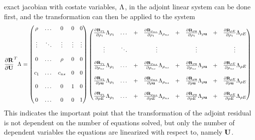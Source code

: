 exact jacobian with costate variables, $\Lambda_{}$, in the adjoint linear system
can be done first, and the transformation can then be applied to the system
\begin{equation}
  \begin{aligned}
    \pd{\mr}{\mU}^{T} \adjlam{} =
    \begin{pmatrix}
      \rho   & \dots  & 0      &  0      & 0      \\ \\
      \vdots & \ddots & \vdots &  \vdots & \vdots \\ \\
      0      & \dots  &\rho    &  0      & 0      \\ \\
      c_1    & \dots  & c_{ns} &  0      & 0      \\ \\
      0      & \dots  & 0      &  1      & 0      \\ \\
      0      & \dots  & 0      &  0      & 1
    \end{pmatrix}
    \begin{pmatrix}
      \rlprod{\rho_1}{\rho_1}    & \dots  &+& \rlprod{\rho_{ns}}{\rho_1}    &+& \rlprod{\rho \vu}{\rho_1}    &+& \rlprod{\rho E}{\rho_1} \\ \\
      \vdots                     & \ddots & & \vdots                        & & \vdots                       & & \vdots                   \\ \\
      \rlprod{\rho_1}{\rho_{ns}} & \dots  &+& \rlprod{\rho_{ns}}{\rho_{ns}} &+& \rlprod{\rho \vu}{\rho_{ns}} &+& \rlprod{\rho E}{\rho_{ns}} \\ \\
      \rlprod{\rho_1}{\rho \vu}  & \dots  &+& \rlprod{\rho_{ns}}{\rho \vu}  &+& \rlprod{\rho \vu}{\rho \vu}  &+& \rlprod{\rho E}{\rho \vu} \\ \\
      \rlprod{\rho_1}{\rho E}    & \dots  &+& \rlprod{\rho_{ns}}{\rho E}    &+& \rlprod{\rho \vu}{\rho E}    &+& \rlprod{\rho E}{\rho E}
    \end{pmatrix}
  \end{aligned}
  \label{adj-drdv}
\end{equation}
This indicates the important point that the transformation of the adjoint
residual is not dependent on the number of equations solved, but only the number
of dependent variables the equations are linearized with respect to, namely
$\mathbf U$.

